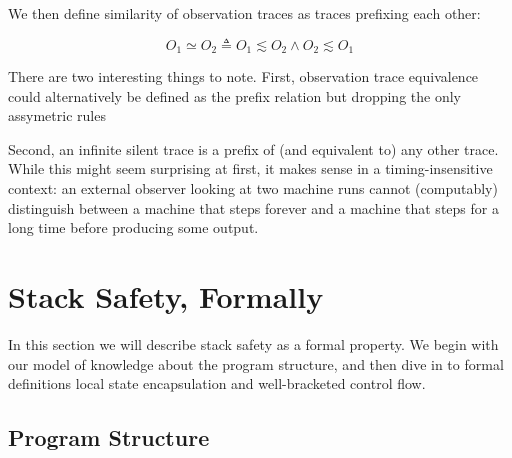 \documentclass[acmsmall,review,anonymous]{acmart}\settopmatter{printfolios=true,printccs=false,printacmref=false}
\begin{document}
We then define similarity of observation traces as traces prefixing each other:

\[O_1 \simeq O_2 \triangleq O_1 \lesssim O_2 \land O_2 \lesssim O_1\]

 There are two interesting things
to note.  First, observation trace equivalence could alternatively be
defined as the prefix relation but dropping the only assymetric rules

Second, an infinite silent trace is a prefix of (and equivalent to)
any other trace. While this might seem surprising at first, it makes
sense in a timing-insensitive context: an external observer looking
at two machine runs cannot (computably) distinguish between a machine that
steps forever and a machine that steps for a long time before producing
some output.

%
%

\section{Stack Safety, Formally}
\label{sec:lse-and-wbcf}

In this section we will describe stack safety as a formal property. We
begin with our model of  knowledge about the
program structure, and then dive in to formal definitions local state
encapsulation and well-bracketed control flow.

\subsection{Program Structure}
\end{document}

